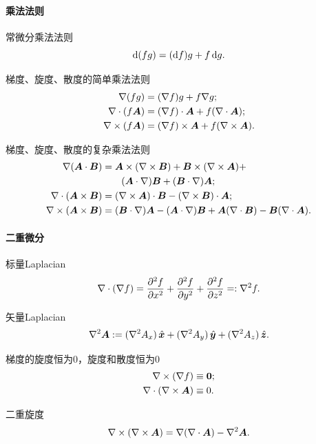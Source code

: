 \paragraph{乘法法则}
\begin{compactitem}
	\item 常微分乘法法则
    \[
        \mathop{}\!\mathrm{d}(fg)=(\mathop{}\!\mathrm{d} f)g+f\mathop{}\!\mathrm{d} g.
    \]
    \item 梯度、旋度、散度的简单乘法法则
    \begin{align}
        \nabla(fg)&=(\nabla f)g+f\nabla g;\\
        \nabla\cdot(f\bm A)&=(\nabla f)\cdot\bm A+f(\nabla\cdot\bm A);\\
        \nabla\times(f\bm A)&=(\nabla f)\times\bm A+f(\nabla\times\bm A).
    \end{align}
    \item 梯度、旋度、散度的复杂乘法法则
    \begin{align}
        \notag
        \nabla(\bm A\cdot\bm B)&=\bm A\times(\nabla\times\bm B)+\bm B\times(\nabla\times\bm A)+\\
        \label{eqn:gradA.B}
        &\qquad(\bm A\cdot\nabla)\bm B+(\bm B\cdot\nabla)\bm A;\\
        \label{eqn:divAxB}
        \nabla\cdot(\bm A\times\bm B)&=(\nabla\times\bm A)\cdot\bm B-(\nabla\times\bm B)\cdot\bm A;\\
        \label{eqn:curlAxB}
        \nabla\times(\bm A\times\bm B)&=(\bm B\cdot\nabla)\bm A-(\bm A\cdot\nabla)\bm B+\bm A(\nabla\cdot\bm B)-\bm B(\nabla\cdot\bm A).
    \end{align}
\end{compactitem}
\paragraph{二重微分}
\begin{compactitem}
	\item 标量Laplacian
    \begin{align}
        \nabla\cdot(\nabla f)=\frac{\partial^{2}f}{\partial x^{2}}+\frac{\partial^{2}f}{\partial y^{2}}+\frac{\partial^{2}f}{\partial z^{2}}=:\nabla^2f.
    \end{align}
	\item 矢量Laplacian
	\begin{align}
        \nabla^2\bm A:=(\nabla^2A_x)\mathop{}\!\hat{\bm x}+(\nabla^2A_y)\mathop{}\!\hat{\bm y}+(\nabla^2A_z)\mathop{}\!\hat{\bm z}.
    \end{align}
    \item 梯度的旋度恒为0，旋度和散度恒为0
    \begin{align}
        \label{eqn:curlgrad}
        \nabla\times(\nabla f)&\equiv \bm 0;\\
        \label{eqn:divcurl}
        \nabla\cdot(\nabla\times\bm A)&\equiv 0.
    \end{align}
    \item 二重旋度
    \begin{align}
        \label{eqn:curlcurl}
        \nabla\times(\nabla\times\bm A)=\nabla(\nabla\cdot\bm A)-\nabla^2\bm A.
    \end{align}
\end{compactitem}
